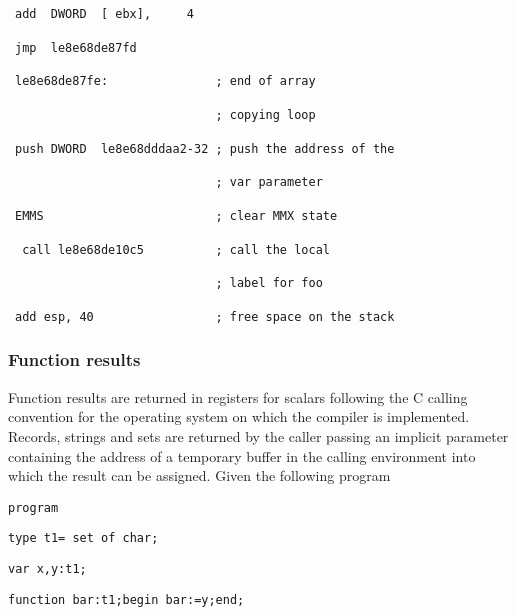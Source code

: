 {\begin{lyxcode}
~\texttt{\footnotesize add~~DWORD~~{[}~ebx{]},~~~~~4}{\footnotesize \par}

~\texttt{\footnotesize jmp~~le8e68de87fd}{\footnotesize \par}

~\texttt{\footnotesize le8e68de87fe:~~~~~~~~~~~~~~~;~end~of~array~}{\footnotesize \par}

~\texttt{\footnotesize ~~~~~~~~~~~~~~~~~~~~~~~~~~~~;~copying~loop}{\footnotesize \par}

~\texttt{\footnotesize push~DWORD~~le8e68dddaa2-32~;~push~the~address~of~the~}{\footnotesize \par}

~\texttt{\footnotesize ~~~~~~~~~~~~~~~~~~~~~~~~~~~~;~var~parameter}{\footnotesize \par}

~\texttt{\footnotesize EMMS~~~~~~~~~~~~~~~~~~~~~~~~;~clear~MMX~state}{\footnotesize \par}

~\texttt{\footnotesize ~call~le8e68de10c5~~~~~~~~~~;~call~the~local~}{\footnotesize \par}

~\texttt{\footnotesize ~~~~~~~~~~~~~~~~~~~~~~~~~~~~;~label~for~foo}{\footnotesize \par}

~\texttt{\footnotesize add~esp,~40~~~~~~~~~~~~~~~~~;~free~space~on~the~stack}{\footnotesize \par}
\end{lyxcode}

\subsubsection{Function results}

Function results are returned in registers for scalars following the C calling
convention for the operating system on which the compiler is implemented. Records,
strings and sets are returned by the caller passing an implicit parameter containing
the address of a temporary buffer in the calling environment into which the
result can be assigned. Given the following program

\texttt{program}

\texttt{type t1= set of char;}

\texttt{var x,y:t1;}

\texttt{function bar:t1;begin bar:=y;end;}

}
